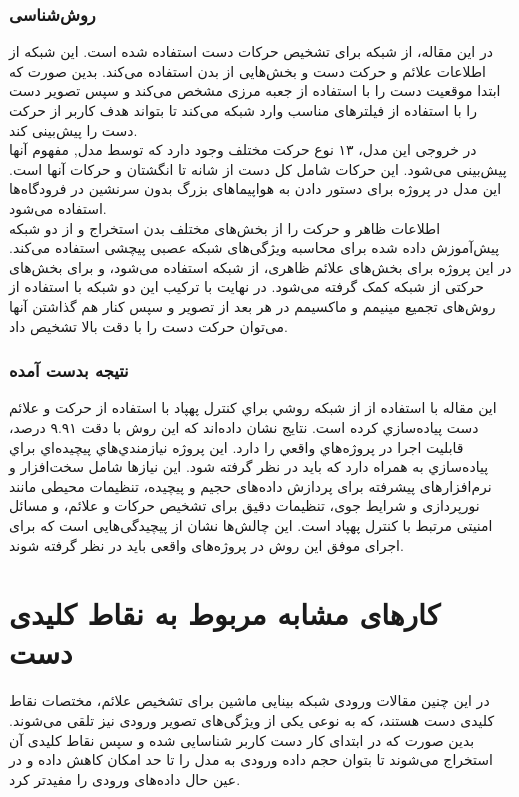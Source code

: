 \subsubsection{روش‌شناسی}
در این مقاله، از شبکه   برای تشخیص حرکات دست استفاده شده است. این شبکه از اطلاعات علائم و حرکت دست و بخش‌هایی از بدن  
استفاده می‌کند. بدین صورت که ابتدا موقعیت دست را با استفاده از جعبه مرزی مشخص می‌کند و سپس تصویر دست را با استفاده از فیلترهای مناسب وارد شبکه  می‌کند تا بتواند هدف کاربر از حرکت دست را پیش‌بینی کند.
\\
در خروجی این مدل، ۱۳ نوع حرکت مختلف وجود دارد که توسط مدل, مفهوم آنها پیش‌بینی می‌شود. این حرکات شامل کل دست از شانه تا انگشتان و حرکات آنها است. این مدل در پروژه برای دستور دادن به هواپیماهای بزرگ بدون سرنشین در فرودگاه‌ها استفاده می‌شود.
\\
 اطلاعات ظاهر و حرکت را از بخش‌های مختلف بدن استخراج و از دو شبکه پیش‌آموزش داده شده برای محاسبه ویژگی‌های شبکه عصبی پیچشی استفاده می‌کند. در این پروژه برای بخش‌های علائم ظاهری، از شبکه  استفاده می‌شود، و برای 
بخش‌های حرکتی از شبکه  کمک گرفته می‌شود.
در نهایت با ترکیب این دو شبکه با استفاده از روش‌های تجمیع مینیمم و ماکسیمم در هر بعد از تصویر و سپس کنار هم گذاشتن آنها می‌توان حرکت دست را با دقت بالا تشخیص داد.

\subsubsection{نتیجه بدست آمده}
اين مقاله با استفاده از از شبكه  روشي براي كنترل پهپاد با استفاده از حركت و علائم دست پياده‌سازي كرده است. نتايج نشان داده‌اند كه اين روش با دقت ۹.۹۱ درصد، قابليت اجرا در پروژه‌هاي واقعي را دارد.  این پروژه نيازمندي‌هاي پيچيده‌اي براي پياده‌سازي به همراه دارد كه بايد در نظر گرفته شود. این نیاز‌ها شامل سخت‌افزار و نرم‌افزار‌های پیشرفته برای پردازش داده‌های حجیم و پیچیده،
 تنظیمات محیطی مانند نورپردازی و شرایط جوی، تنظیمات دقیق برای تشخیص حرکات و علائم، و مسائل امنیتی مرتبط با کنترل پهپاد است. این چالش‌ها نشان از پیچیدگی‌هایی است که برای اجرای موفق این روش در پروژه‌های واقعی باید در نظر گرفته شوند.




\section{کارهای مشابه مربوط به نقاط کلیدی دست}
در این چنین مقالات ورودی شبکه بینایی ماشین برای تشخیص علائم، مختصات نقاط کلیدی دست هستند، که به نوعی یکی از ویژگی‌های تصویر ورودی نیز تلقی می‌شوند. بدین صورت که در ابتدای کار دست کاربر شناسایی شده و سپس نقاط کلیدی آن استخراج می‌شوند تا بتوان حجم داده ورودی به مدل را تا حد امکان کاهش داده و در عین حال داده‌های ورودی را مفیدتر کرد.

